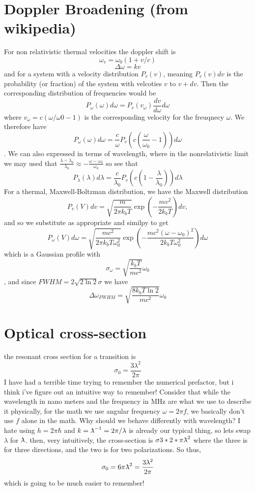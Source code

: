 \documentclass[../../main.tex]{subfiles} %
\begin{document}
\section{Doppler Broadening (from wikipedia)}
For non relativistic thermal velocities the doppler shift is $$\omega_v=\omega_0(1+v/c)$$ $$\Delta\omega=kv$$ and for a system with a velocity distribution $P_v(v)$, meaning $P_v(v)dv$ is the probability (or fraction) of the system with velcoties $v$ to $v+dv$. Then the corresponding  distribution of frequencies would be $$P_\omega(\omega)d\omega=P_v(v_{\omega})\frac{dv}{d\omega}d\omega$$ where $v_\omega=c(\omega/\omega0-1)$ is the corresponding velocity for the freuqnecy $\omega$. We therefore have $$P_\omega(\omega)d\omega=\frac{c}{\omega}P_v\left(c\left(\frac{\omega}{\omega_0}-1\right)\right)d\omega$$. We can also expressed in terms of wavelength, where in the nonrelativistic limit we may used that $\frac{\lambda-\lambda_0}{\lambda_0}\approx -\frac{\omega-\omega_0}{\omega_0}$ so see that $$P_\lambda(\lambda)d\lambda=\frac{c}{\lambda_0}P_v\left(c\left(1-\frac{\lambda}{\lambda_0}\right)\right)d\lambda$$
For a thermal, Maxwell-Boltzman distribution, we have the Maxwell distribution 
\begin{equation}\label{eq. maxwell distribution}
    P_v(V)dv=\sqrt{\frac{m}{2\pi k_b T}}\exp\left(-\frac{mv^2}{2k_bT}\right)dv,
\end{equation}
and so we substitute as appropriate and similpy to get $$P_\omega(V)d\omega=\sqrt{\frac{mc^2}{2\pi k_b T\omega_0^2}}\exp\left(-\frac{mc^2(\omega-\omega_0)^2}{2k_bT\omega_0^2}\right)d\omega$$ which is a Gaussian profile with $$\sigma_\omega=\sqrt{\frac{k_bT}{mc^2}}\omega_0$$, and since $FWHM=2\sqrt{2\ln2}\sigma$ we have 
\begin{equation}
    \Delta\omega_{FWHM}=\sqrt{\frac{8k_bT\ln2}{mc^2}}\omega_0
\end{equation}

\section{Optical cross-section}

the resonant cross section for a transition is 
\begin{equation}
    \sigma_0=\frac{3\lambda^2}{2\pi}    
\end{equation}
I have had a terrible time trying to remember the numerical prefactor, but i think i've figure out an intuitive way to remember! Consider that while the wavelength in nano meters and the frequency in MHz are what we use to describe it physically, for the math we use angular frequency $\omega=2\pi f$, we basically don't use $f$ alone in the math. Why should we behave differently with wavelength? I hate using $h=2\pi\hbar$ and $k=\lambdabar^{-1}=2\pi/\lambda$ is already our typical thing, so lets swap $\lambda$ for $\lambdabar$. then, very intuitively, the cross-section is $\sigma 3*2*\pi\lambdabar^2$ where the three is for three directions, and the two is for two polarizations. So thus, 
\begin{equation}\label{eq. optical cross-section}
   \sigma_0=6\pi\lambdabar^2=\frac{3\lambda^2}{2\pi}
\end{equation}
which is going to be much easier to remember!
\end{document}
